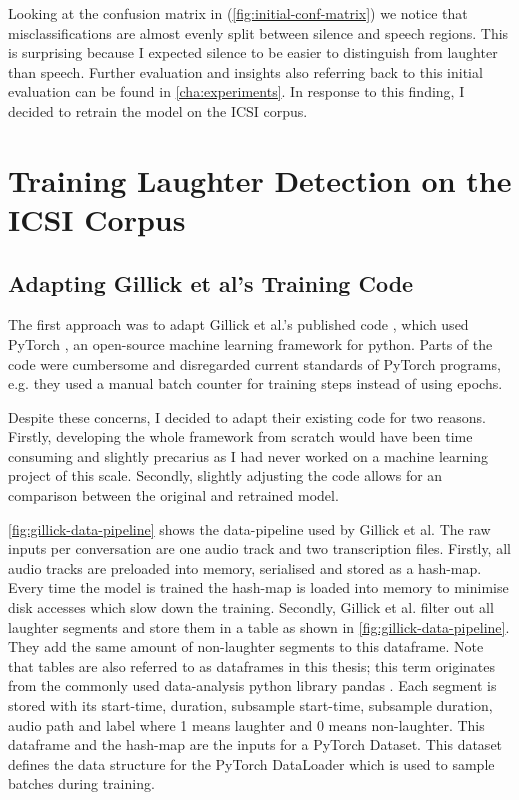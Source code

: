 \documentclass[bsc,frontabs,parskip,deptreport]{infthesis}
\begin{document}
Looking at the confusion matrix in (\autoref{fig:initial-conf-matrix}) we notice that misclassifications are almost evenly split between silence and speech regions. This is surprising because I expected silence to be easier to distinguish from laughter than speech.
Further evaluation and insights also referring back to this initial evaluation can be found in \autoref{cha:experiments}.
In response to this finding, I decided to retrain the model on the ICSI corpus. 


\chapter{Training Laughter Detection on the ICSI Corpus} \label{cha:retraining}
\section{Adapting Gillick et al's Training Code} 
The first approach was to adapt Gillick et al.'s published code \citep{gillick-codebase}, which used PyTorch \citep{pytorch2017automatic}, an open-source machine learning framework for python.
Parts of the code were cumbersome and disregarded current standards of PyTorch programs, e.g. they used a manual batch counter for training steps instead of using epochs.  

Despite these concerns, I decided to adapt their existing code for two reasons.
Firstly, developing the whole framework from scratch would have been time consuming and slightly precarius as I had never worked on a machine learning project of this scale.
Secondly, slightly adjusting the code allows for an comparison between the original and retrained model. 

\autoref{fig:gillick-data-pipeline} shows the data-pipeline used by Gillick et al. The raw inputs per conversation are one audio track and two transcription files. 
Firstly, all audio tracks are preloaded into memory, serialised and stored as a hash-map. Every time the model is trained the hash-map is loaded into memory to minimise disk accesses which slow down the training. 
Secondly, Gillick et al. filter out all laughter segments and store them in a table as shown in \autoref{fig:gillick-data-pipeline}.
They add the same amount of non-laughter segments to this dataframe. 
Note that tables are also referred to as dataframes in this thesis; this term originates from the commonly used data-analysis python library pandas \citep{jeff_reback_2021_5574486}.
Each segment is stored with its start-time, duration, subsample start-time, subsample duration, audio path and label where 1 means laughter and 0 means non-laughter. 
This dataframe and the hash-map are the inputs for a PyTorch Dataset. This dataset defines the data structure for the PyTorch DataLoader which is used to sample batches during training.
\end{document}
